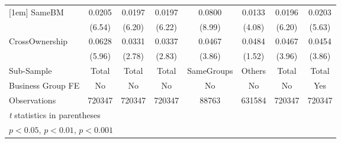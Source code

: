 {\begin{tabular}{l*{7}{c}}
[1em]
SameBM          &   0.0205\sym{***}&   0.0197\sym{***}&   0.0197\sym{***}&   0.0800\sym{***}&   0.0133\sym{***}&   0.0196\sym{***}&   0.0203\sym{***}\\
                &   (6.54)         &   (6.20)         &   (6.22)         &   (8.99)         &   (4.08)         &   (6.20)         &   (5.63)         \\
[1em]
CrossOwnership  &   0.0628\sym{***}&   0.0331\sym{**} &   0.0337\sym{**} &   0.0467\sym{***}&   0.0484         &   0.0467\sym{***}&   0.0454\sym{***}\\
                &   (5.96)         &   (2.78)         &   (2.83)         &   (3.86)         &   (1.52)         &   (3.96)         &   (3.86)         \\
\hline
Sub-Sample      &    Total         &    Total         &    Total         &SameGroups         &   Others         &    Total         &    Total         \\
Business Group FE&       No         &       No         &       No         &       No         &       No         &       No         &      Yes         \\
Observations    &   720347         &   720347         &   720347         &    88763         &   631584         &   720347         &   720347         \\
\hline\hline
\multicolumn{8}{l}{\footnotesize \textit{t} statistics in parentheses}\\
\multicolumn{8}{l}{\footnotesize \sym{*} \(p<0.05\), \sym{**} \(p<0.01\), \sym{***} \(p<0.001\)}\\
\end{tabular}
}

